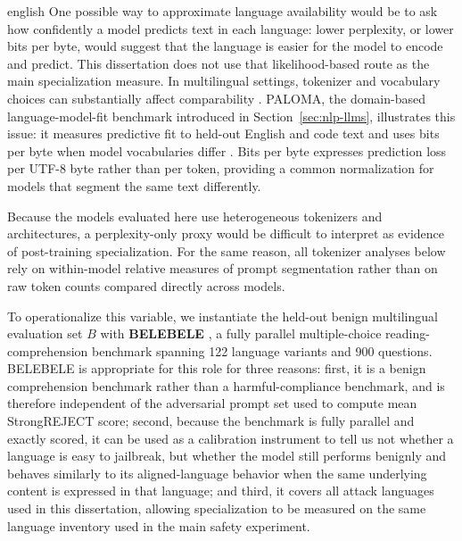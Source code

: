\begin{otherlanguage*}{english}
One possible way to approximate language availability would be to ask how confidently a model predicts text in each language: lower perplexity, or lower bits per byte, would suggest that the language is easier for the model to encode and predict. This dissertation does not use that likelihood-based route as the main specialization measure. In multilingual settings, tokenizer and vocabulary choices can substantially affect comparability \cite{rust2021tokenizer}. PALOMA, the domain-based language-model-fit benchmark introduced in Section~\ref{sec:nlp-llms}, illustrates this issue: it measures predictive fit to held-out English and code text and uses bits per byte when model vocabularies differ \cite{magnusson2023paloma}. Bits per byte expresses prediction loss per UTF-8 byte rather than per token, providing a common normalization for models that segment the same text differently. 

Because the models evaluated here use heterogeneous tokenizers and architectures, a perplexity-only proxy would be difficult to interpret as evidence of post-training specialization. For the same reason, all tokenizer analyses below rely on within-model relative measures of prompt segmentation rather than on raw token counts compared directly across models.

To operationalize this variable, we instantiate the held-out benign multilingual evaluation set $B$ with \textbf{BELEBELE} \cite{bandarkar-etal-2024-belebele}, a fully parallel multiple-choice reading-comprehension benchmark spanning 122 language variants and 900 questions. BELEBELE is appropriate for this role for three reasons: first, it is a benign comprehension benchmark rather than a harmful-compliance benchmark, and is therefore independent of the adversarial prompt set used to compute mean StrongREJECT score; second, because the benchmark is fully parallel and exactly scored, it can be used as a calibration instrument to tell us not whether a language is easy to jailbreak, but whether the model still performs benignly and behaves similarly to its aligned-language behavior when the same underlying content is expressed in that language; and third, it covers all attack languages used in this dissertation, allowing specialization to be measured on the same language inventory used in the main safety experiment.


\end{otherlanguage*}
